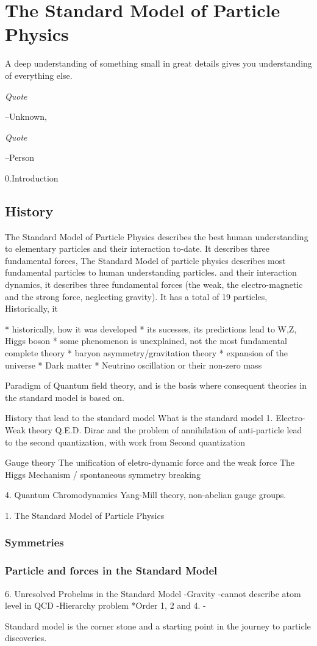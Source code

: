 \chapter{The Standard Model of Particle Physics}

	
A deep understanding of something small in great details gives you understanding of everything else. 


\epigraph{\textit{Quote}}{--Unknown, \textit{}}
\epigraph{\textit{Quote}}{--Person}

0.Introduction 
    
\section{History}
    The Standard Model of Particle Physics describes the best human understanding to elementary particles and their interaction to-date. It describes three fundamental forces, 
    The Standard Model of particle physics describes most fundamental particles to human understanding particles. and their interaction dynamics, it describes three fundamental forces (the weak, the electro-magnetic and the strong force, neglecting gravity). It has a total of 19 particles, 
    Historically, it 

    * historically, how it was developed
    * its sucesses, its predictions lead to W,Z, Higgs boson
    * some phenomenon is unexplained, 
    not the most fundamental complete theory 
    * baryon asymmetry/gravitation theory
    * expansion of the universe 
    * Dark matter
    * Neutrino oscillation or their non-zero mass

    Paradigm of Quantum field theory, and is the basis where consequent theories in the standard model is based on. 

    History that lead to the standard model
    What is the standard model 
1. Electro-Weak theory
    Q.E.D.
    Dirac and the problem of annihilation of anti-particle lead to the second quantization, with work from 
    Second quantization

    Gauge theory
    The unification of eletro-dynamic force and the weak force
    The Higgs Mechanism / spontaneous symmetry breaking 


4. Quantum Chromodynamics
    Yang-Mill theory, non-abelian gauge groups. 
    
    
1. The Standard Model of Particle Physics
    \subsection{Symmetries}
    \subsection{Particle and forces in the Standard Model}

6. Unresolved Probelms in the Standard Model
-Gravity
-cannot describe atom level in QCD
-Hierarchy problem 
    *Order 1, 2 and 4. 
-

Standard model is the corner stone and a starting point in the journey to particle discoveries.

